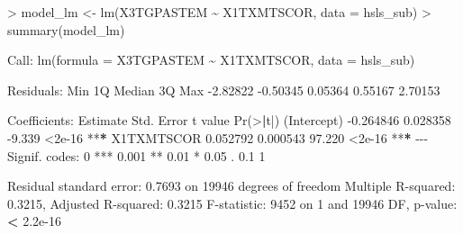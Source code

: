 \documentclass[
]{article}
\newenvironment{Shaded}{\begin{snugshade}}{\end{snugshade}}
\newcommand{\AttributeTok}[1]{\textcolor[rgb]{0.77,0.63,0.00}{#1}}
\newcommand{\DecValTok}[1]{\textcolor[rgb]{0.00,0.00,0.81}{#1}}
\newcommand{\ErrorTok}[1]{\textcolor[rgb]{0.64,0.00,0.00}{\textbf{#1}}}
\newcommand{\FloatTok}[1]{\textcolor[rgb]{0.00,0.00,0.81}{#1}}
\newcommand{\FunctionTok}[1]{\textcolor[rgb]{0.00,0.00,0.00}{#1}}
\newcommand{\NormalTok}[1]{#1}
\newcommand{\OtherTok}[1]{\textcolor[rgb]{0.56,0.35,0.01}{#1}}
\newcommand{\SpecialCharTok}[1]{\textcolor[rgb]{0.00,0.00,0.00}{#1}}
\newcommand{\StringTok}[1]{\textcolor[rgb]{0.31,0.60,0.02}{#1}}
\begin{document}
\begin{Shaded}
\begin{Highlighting}[]
\SpecialCharTok{\textgreater{}}\NormalTok{ model\_lm }\OtherTok{\textless{}{-}} \FunctionTok{lm}\NormalTok{(X3TGPASTEM }\SpecialCharTok{\textasciitilde{}}\NormalTok{ X1TXMTSCOR, }\AttributeTok{data =}\NormalTok{ hsls\_sub)}
\SpecialCharTok{\textgreater{}} \FunctionTok{summary}\NormalTok{(model\_lm)}

\NormalTok{Call}\SpecialCharTok{:}
\FunctionTok{lm}\NormalTok{(}\AttributeTok{formula =}\NormalTok{ X3TGPASTEM }\SpecialCharTok{\textasciitilde{}}\NormalTok{ X1TXMTSCOR, }\AttributeTok{data =}\NormalTok{ hsls\_sub)}

\NormalTok{Residuals}\SpecialCharTok{:}
\NormalTok{     Min       1Q   Median       3Q      Max }
\SpecialCharTok{{-}}\FloatTok{2.82822} \SpecialCharTok{{-}}\FloatTok{0.50345}  \FloatTok{0.05364}  \FloatTok{0.55167}  \FloatTok{2.70153} 

\NormalTok{Coefficients}\SpecialCharTok{:}
\NormalTok{             Estimate Std. Error t value }\FunctionTok{Pr}\NormalTok{(}\SpecialCharTok{\textgreater{}}\ErrorTok{|}\NormalTok{t}\SpecialCharTok{|}\NormalTok{)    }
\NormalTok{(Intercept) }\SpecialCharTok{{-}}\FloatTok{0.264846}   \FloatTok{0.028358}  \SpecialCharTok{{-}}\FloatTok{9.339}   \SpecialCharTok{\textless{}}\FloatTok{2e{-}16} \SpecialCharTok{**}\ErrorTok{*}
\NormalTok{X1TXMTSCOR   }\FloatTok{0.052792}   \FloatTok{0.000543}  \FloatTok{97.220}   \SpecialCharTok{\textless{}}\FloatTok{2e{-}16} \SpecialCharTok{**}\ErrorTok{*}
\SpecialCharTok{{-}{-}{-}}
\NormalTok{Signif. codes}\SpecialCharTok{:}  \DecValTok{0} \StringTok{\textquotesingle{}***\textquotesingle{}} \FloatTok{0.001} \StringTok{\textquotesingle{}**\textquotesingle{}} \FloatTok{0.01} \StringTok{\textquotesingle{}*\textquotesingle{}} \FloatTok{0.05} \StringTok{\textquotesingle{}.\textquotesingle{}} \FloatTok{0.1} \StringTok{\textquotesingle{} \textquotesingle{}} \DecValTok{1}

\NormalTok{Residual standard error}\SpecialCharTok{:} \FloatTok{0.7693}\NormalTok{ on }\DecValTok{19946}\NormalTok{ degrees of freedom}
\NormalTok{Multiple R}\SpecialCharTok{{-}}\NormalTok{squared}\SpecialCharTok{:}  \FloatTok{0.3215}\NormalTok{,    Adjusted R}\SpecialCharTok{{-}}\NormalTok{squared}\SpecialCharTok{:}  \FloatTok{0.3215} 
\NormalTok{F}\SpecialCharTok{{-}}\NormalTok{statistic}\SpecialCharTok{:}  \DecValTok{9452}\NormalTok{ on }\DecValTok{1}\NormalTok{ and }\DecValTok{19946}\NormalTok{ DF,  p}\SpecialCharTok{{-}}\NormalTok{value}\SpecialCharTok{:} \ErrorTok{\textless{}} \FloatTok{2.2e{-}16}
\end{Highlighting}
\end{Shaded}
\end{document}
